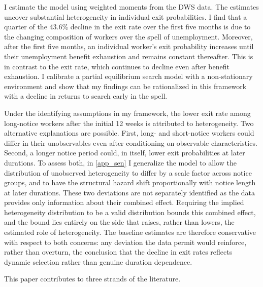 \documentclass{div}
\newcommand{\ObsHazOnetoTwo}{43.6}
\begin{document}
I estimate the model using weighted moments from the DWS data. The estimates uncover substantial heterogeneity in individual exit probabilities. I find that a quarter of the \ObsHazOnetoTwo\% decline in the exit rate over the first five months is due to the changing composition of workers over the spell of unemployment. Moreover, after the first five months, an individual worker's exit probability increases until their unemployment benefit exhaustion and remains constant thereafter. This is in contrast to the exit rate, which continues to decline even after benefit exhaustion. I calibrate a partial equilibrium search model with a non-stationary environment \citep{Mortensen1986, VanDenBerg1990} and show that my findings can be rationalized in this framework with a decline in returns to search early in the spell.

Under the identifying assumptions in my framework, the lower exit rate among long-notice workers after the initial 12 weeks is attributed to heterogeneity. Two alternative explanations are possible. First, long- and short-notice workers could differ in their unobservables even after conditioning on observable characteristics. Second, a longer notice period could, in itself, lower exit probabilities at later durations. To assess both, in \ref{app_sen} I generalize the model to allow the distribution of unobserved heterogeneity to differ by a scale factor across notice groups, and to have the structural hazard shift proportionally with notice length at later durations. These two deviations are not separately identified as the data provides only information about their combined effect. Requiring the implied heterogeneity distribution to be a valid distribution bounds this combined effect, and the bound lies entirely on the side that raises, rather than lowers, the estimated role of heterogeneity. The baseline estimates are therefore conservative with respect to both concerns: any deviation the data permit would reinforce, rather than overturn, the conclusion that the decline in exit rates reflects dynamic selection rather than genuine duration dependence.

This paper contributes to three strands of the literature.
\end{document}

